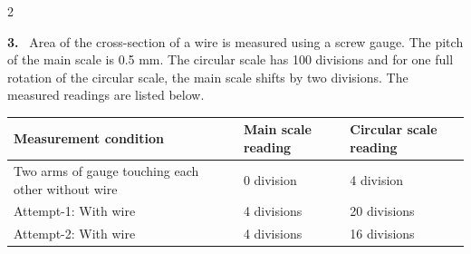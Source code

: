 \documentclass[10pt]{extarticle}
\newcommand{\qn}[1]{\par\smallskip\noindent\textbf{#1.}~}
\begin{document}
\begin{multicols}{2}
\qn{3} Area of the cross-section of a wire is measured using a screw gauge. The pitch of the main scale is 0.5 mm. The circular scale has 100 divisions and for one full rotation of the circular scale, the main scale shifts by two divisions. The measured readings are listed below.
\end{multicols}
\begin{center}
\begin{tabular}{|p{4.5cm}|p{4cm}|p{4cm}|}
\hline
Measurement condition & Main scale reading & Circular scale reading \\
\hline
Two arms of gauge touching each other without wire & 0 division & 4 division \\
\hline
Attempt-1: With wire & 4 divisions & 20 divisions \\
\hline
Attempt-2: With wire & 4 divisions & 16 divisions \\
\hline
\end{tabular}
\end{center}
\end{document}
